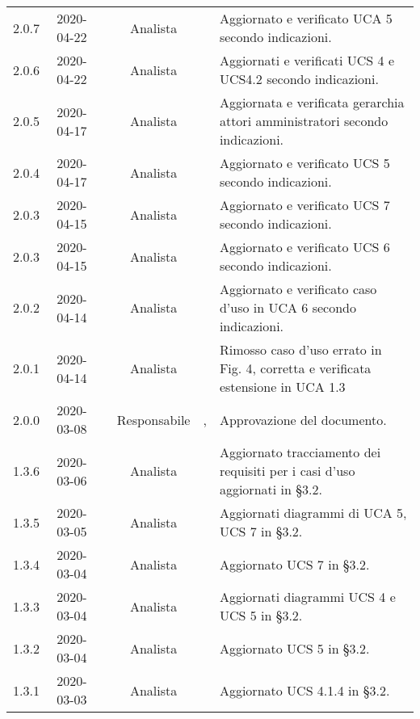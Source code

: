 {\begin{longtable}{ c c  C{2.3cm} c C{3cm} C{3.2cm}}
2.0.7 & 2020-04-22 & \AT{} & Analista & \PF{} & Aggiornato e verificato UCA 5 secondo indicazioni. \\

2.0.6 & 2020-04-22 & \AT{} & Analista & \CE{} & Aggiornati e verificati UCS 4 e UCS4.2 secondo indicazioni. \\

2.0.5 & 2020-04-17 & \AT{} & Analista & \CE{} & Aggiornata e verificata gerarchia attori amministratori secondo indicazioni. \\

2.0.4 & 2020-04-17 & \DF{} & Analista & \CE{} & Aggiornato e verificato UCS 5 secondo indicazioni. \\

2.0.3 & 2020-04-15 & \DF{} & Analista & \PF{} & Aggiornato e verificato UCS 7 secondo indicazioni. \\

2.0.3 & 2020-04-15 & \DF{} & Analista & \PF{} & Aggiornato e verificato UCS 6 secondo indicazioni. \\

2.0.2 & 2020-04-14 & \DF{} & Analista & \CE{} & Aggiornato e verificato caso d'uso in UCA 6 secondo indicazioni. \\

2.0.1 & 2020-04-14 & \DF{} & Analista & \PF{} & Rimosso caso d'uso errato in Fig. 4, corretta e verificata estensione in UCA 1.3 \\

2.0.0 & 2020-03-08 & \LD{} & Responsabile & \CE{}, \PF{} & Approvazione del documento. \\

1.3.6 & 2020-03-06 & \AT{} & Analista & \DF{} & Aggiornato tracciamento dei requisiti per i casi d'uso aggiornati in §3.2. \\

1.3.5 & 2020-03-05 & \AT{} & Analista & \PF{} & Aggiornati diagrammi di UCA 5, UCS 7 in §3.2. \\

1.3.4 & 2020-03-04 & \AT{} & Analista & \PF{} & Aggiornato UCS 7 in §3.2. \\

1.3.3 & 2020-03-04 & \SE{} & Analista & \PF{} & Aggiornati diagrammi UCS 4 e UCS 5 in §3.2. \\

1.3.2 & 2020-03-04 & \SE{} & Analista & \DF{} & Aggiornato UCS 5 in §3.2. \\

1.3.1 & 2020-03-03 & \SE{} & Analista & \PF{} & Aggiornato UCS 4.1.4 in §3.2. \\


\end{longtable}}
